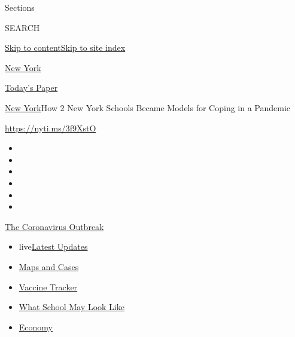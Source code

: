 Sections

SEARCH

\protect\hyperlink{site-content}{Skip to
content}\protect\hyperlink{site-index}{Skip to site index}

\href{https://www.nytimes3xbfgragh.onion/section/nyregion}{New York}

\href{https://myaccount.nytimes3xbfgragh.onion/auth/login?response_type=cookie\&client_id=vi}{}

\href{https://www.nytimes3xbfgragh.onion/section/todayspaper}{Today's
Paper}

\href{/section/nyregion}{New York}\textbar{}How 2 New York Schools
Became Models for Coping in a Pandemic

\url{https://nyti.ms/3f9XstO}

\begin{itemize}
\item
\item
\item
\item
\item
\item
\end{itemize}

\href{https://www.nytimes3xbfgragh.onion/news-event/coronavirus?action=click\&pgtype=Article\&state=default\&region=TOP_BANNER\&context=storylines_menu}{The
Coronavirus Outbreak}

\begin{itemize}
\tightlist
\item
  live\href{https://www.nytimes3xbfgragh.onion/2020/08/02/world/coronavirus-updates.html?action=click\&pgtype=Article\&state=default\&region=TOP_BANNER\&context=storylines_menu}{Latest
  Updates}
\item
  \href{https://www.nytimes3xbfgragh.onion/interactive/2020/us/coronavirus-us-cases.html?action=click\&pgtype=Article\&state=default\&region=TOP_BANNER\&context=storylines_menu}{Maps
  and Cases}
\item
  \href{https://www.nytimes3xbfgragh.onion/interactive/2020/science/coronavirus-vaccine-tracker.html?action=click\&pgtype=Article\&state=default\&region=TOP_BANNER\&context=storylines_menu}{Vaccine
  Tracker}
\item
  \href{https://www.nytimes3xbfgragh.onion/interactive/2020/07/29/us/schools-reopening-coronavirus.html?action=click\&pgtype=Article\&state=default\&region=TOP_BANNER\&context=storylines_menu}{What
  School May Look Like}
\item
  \href{https://www.nytimes3xbfgragh.onion/live/2020/07/31/business/stock-market-today-coronavirus?action=click\&pgtype=Article\&state=default\&region=TOP_BANNER\&context=storylines_menu}{Economy}
\end{itemize}


